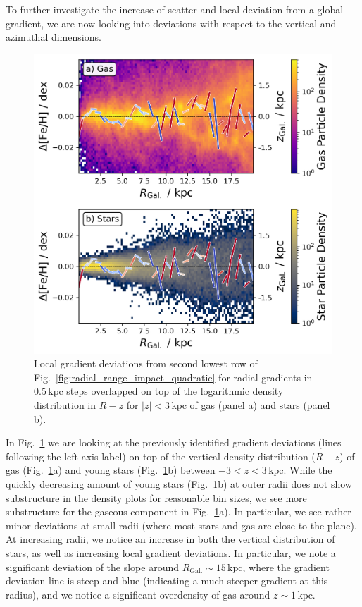 \documentclass[fleqn,usenatbib]{mnras}
\begin{document}
To further investigate the increase of scatter and local deviation from a global gradient, we are now looking into deviations with respect to the vertical and azimuthal dimensions.

\begin{figure}
    \centering
    \includegraphics[width=\columnwidth]{figures/overlap_local_variation_gas.png}
    \caption{Local gradient deviations from second lowest row of Fig.~\ref{fig:radial_range_impact_quadratic} for radial gradients in $0.5\,\mathrm{kpc}$ steps overlapped on top of the logarithmic density distribution in $R-z$ for $\vert z \vert < 3\,\mathrm{kpc}$ of gas (panel a) and stars (panel b).}
    \label{fig:overlap_local_variation_gas}
\end{figure}

In Fig.~\ref{fig:overlap_local_variation_gas} we are looking at the previously identified gradient deviations (lines following the left axis label) on top of the vertical density distribution ($R-z$) of gas (Fig.~\ref{fig:overlap_local_variation_gas}a) and young stars (Fig.~\ref{fig:overlap_local_variation_gas}b) between $-3 < z < 3\,\mathrm{kpc}$. While the quickly decreasing amount of young stars (Fig.~\ref{fig:overlap_local_variation_gas}b) at outer radii does not show substructure in the density plots for reasonable bin sizes, we see more substructure for the gaseous component in Fig.~\ref{fig:overlap_local_variation_gas}a). In particular, we see rather minor deviations at small radii (where most stars and gas are close to the plane). At increasing radii, we notice an increase in both the vertical distribution of stars, as well as increasing local gradient deviations. In particular, we note a significant deviation of the slope around $R_\mathrm{Gal.} \sim 15\,\mathrm{kpc}$, where the gradient deviation line is steep and blue (indicating a much steeper gradient at this radius), and we notice a significant overdensity of gas around $z \sim 1\,\mathrm{kpc}$.
\end{document}
